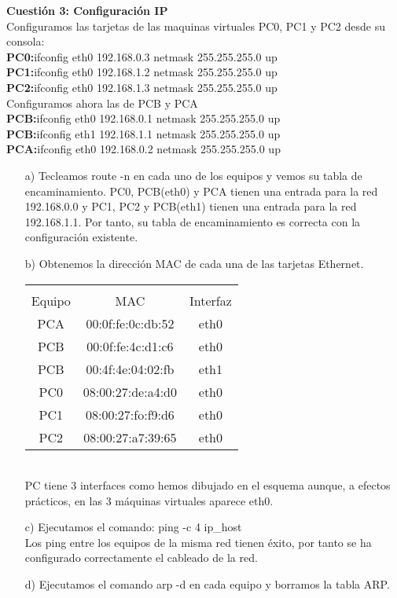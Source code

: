 \documentclass[a4paper,12pt,twoside]{article}
\begin{document}
{\bf Cuestión 3: Configuración IP}\\
Configuramos las tarjetas de las maquinas virtuales PC0, PC1 y PC2 desde su consola:\\
\textbf{PC0:}ifconfig eth0 192.168.0.3 netmask 255.255.255.0 up\\
\textbf{PC1:}ifconfig eth0 192.168.1.2 netmask 255.255.255.0 up\\
\textbf{PC2:}ifconfig eth0 192.168.1.3 netmask 255.255.255.0 up \\


Configuramos ahora las de PCB y PCA\\
\textbf{PCB:}ifconfig eth0 192.168.0.1 netmask 255.255.255.0 up\\
\textbf{PCB:}ifconfig eth1 192.168.1.1 netmask 255.255.255.0 up\\
\textbf{PCA:}ifconfig eth0 192.168.0.2 netmask 255.255.255.0 up\\




\begin{itemize}
\item[a)]
Tecleamos route -n en cada uno de los equipos y vemos su tabla de encaminamiento. PC0, PCB(eth0) y PCA tienen una entrada para la red 192.168.0.0 y PC1, PC2 y PCB(eth1) tienen una entrada para la red 192.168.1.1. Por tanto, su tabla de encaminamiento es correcta con la configuración existente.

\item[b)]
Obtenemos la dirección MAC de cada una de las tarjetas Ethernet.\\

\begin{minipage}[c]{0.4\linewidth}
\centering
\begin{tabular}{c c c} 
\rowcolor{SkyBlue}\multicolumn{3}{c}{\textbf{Dirección MAC}}\\
\rowcolor{SkyBlue}Equipo & MAC & Interfaz\\\hline
PCA & 00:0f:fe:0c:db:52 & eth0\\
PCB & 00:0f:fe:4c:d1:c6 & eth0\\
PCB & 00:4f:4e:04:02:fb & eth1\\
PC0 & 08:00:27:de:a4:d0 & eth0\\
PC1 & 08:00:27:fo:f9:d6 & eth0\\
PC2 & 08:00:27:a7:39:65 & eth0\\\hline

\end{tabular}
\end{minipage}
\\

PC tiene 3 interfaces como hemos dibujado en el esquema aunque, a efectos prácticos, en las 3 máquinas virtuales aparece eth0.


\item[c)]
Ejecutamos el comando: ping -c 4 ip\_host \\
Los ping entre los equipos de la misma red tienen éxito, por tanto se ha configurado correctamente el cableado de la red.

\item[d)]
Ejecutamos el comando arp -d en cada equipo y borramos la tabla ARP.
\end{itemize}
\end{document}
